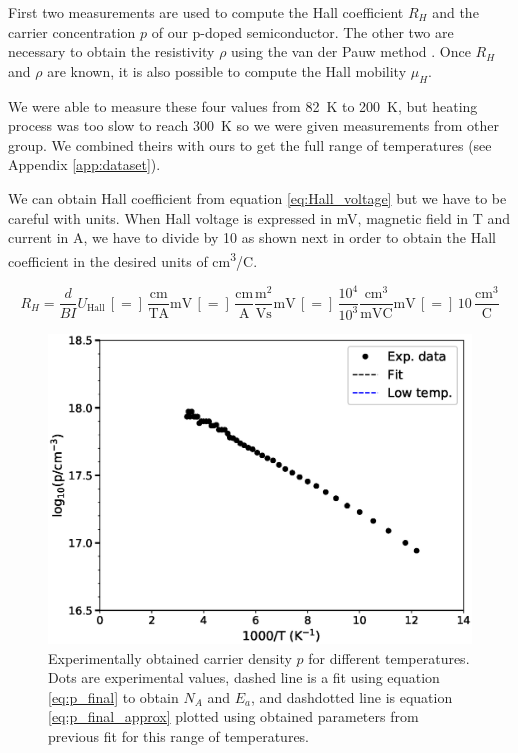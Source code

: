 \documentclass[11pt,a4paper]{article}
\begin{document}
First two measurements are used to compute the Hall coefficient $R_H$ and the carrier concentration $p$ of our p-doped semiconductor. The other two are necessary to obtain the resistivity $\rho$ using the van der Pauw method \cite{vdP}. Once $R_H$ and $\rho$ are known, it is also possible to compute the Hall mobility $\mu_H$.

We were able to measure these four values from \SI{82}{\kelvin} to \SI{200}{\kelvin}, but heating process was too slow to reach \SI{300}{\kelvin} so we were given measurements from other group. We combined theirs with ours to get the full range of temperatures (see Appendix \ref{app:dataset}).

We can obtain Hall coefficient from equation \eqref{eq:Hall_voltage} but we have to be careful with units. When Hall voltage is expressed in \si{\milli\volt}, magnetic field in \si{\tesla} and current in \si{\ampere}, we have to divide by 10 as shown next in order to obtain the Hall coefficient in the desired units of \si{\centi\meter^3/\coulomb}.

\begin{equation*}
R_H=\frac{d}{BI}U_\text{Hall}\,[=]\,\frac{\si{\centi\meter}}{\si{\tesla\ampere}}\si{\milli\volt}\,[=]\,\frac{\si{\centi\meter}}{\si{\ampere}}\frac{\si{\meter^2}}{\si{\volt\second}}\si{\milli\volt}\,[=]\,\frac{10^4}{10^3}\frac{\si{\centi\meter^3}}{\si{\milli\volt\coulomb}}\si{\milli\volt}\,[=]\,10\,\frac{\si{\centi\meter^3}}{\si{\coulomb}}
\end{equation*}

\begin{figure}[H]
\centering
\includegraphics[width=.7\textwidth]{carrier_density.eps}
\caption{Experimentally obtained carrier density $p$ for different temperatures. Dots are experimental values, dashed line is a fit using equation \eqref{eq:p_final} to obtain $N_A$ and $E_a$, and dashdotted line is equation \eqref{eq:p_final_approx} plotted using obtained parameters from previous fit for this range of temperatures.}
\label{fig:carrier_density}
\end{figure}
\end{document}
